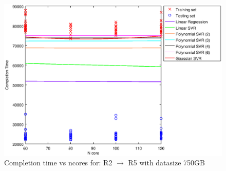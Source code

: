 
\begin {figure}[hbtp]
\centering
\includegraphics[width=\textwidth]{output/R2_R5_750_ALL_FEATURES/plot_R2_R5_750.eps}
\caption{Completion time vs ncores for: R2 $\rightarrow$ R5 with datasize 750GB}
\label{fig:coreonly_linear_R2_R5_750}
\end {figure}
